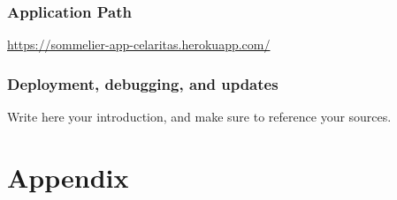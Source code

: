 \documentclass[
]{kaohandt}
\begin{document}
\subsubsection*{Application Path}

\href{https://sommelier-app-celaritas.herokuapp.com/}{https://sommelier-app-celaritas.herokuapp.com/}

\subsubsection*{Deployment, debugging, and updates}

Write here your introduction, and make sure to
reference your sources.

\blindtext\sidenote[][*-8]{\blindtext}

\appendix %

\section{Appendix}

\blindtext



\end{document}
